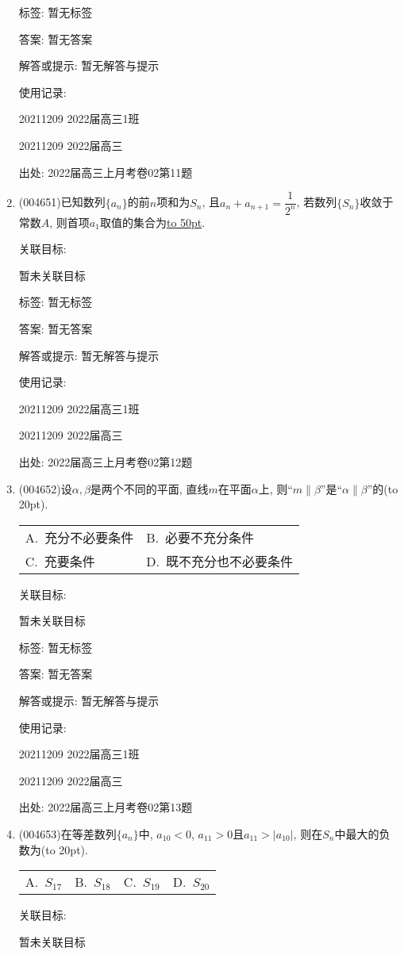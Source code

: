 \documentclass[10pt,a4paper]{article}
\newcommand{\blank}[1]{\underline{\hbox to #1pt{}}}
\newcommand{\bracket}[1]{(\hbox to #1pt{})}
\newcommand{\twoch}[4]{\par\begin{tabular}{p{.46\textwidth}p{.46\textwidth}}
A.~#1& B.~#2\\
C.~#3& D.~#4
\end{tabular}}
\newcommand{\fourch}[4]{\par\begin{tabular}{p{.23\textwidth}p{.23\textwidth}p{.23\textwidth}p{.23\textwidth}}
A.~#1 &B.~#2& C.~#3& D.~#4
\end{tabular}}
\begin{document}
\begin{enumerate}[1.]
标签: 暂无标签

答案: 暂无答案

解答或提示: 暂无解答与提示

使用记录:

20211209	2022届高三1班	

20211209	2022届高三	


出处: 2022届高三上月考卷02第11题
\item { (004651)}已知数列$\{a_n\}$的前$n$项和为$S_n$, 且$a_n+a_{n+1}=\dfrac 1{2^n}$, 若数列$\{S_n\}$收敛于常数$A$, 则首项$a_1$取值的集合为\blank{50}.


关联目标:

暂未关联目标



标签: 暂无标签

答案: 暂无答案

解答或提示: 暂无解答与提示

使用记录:

20211209	2022届高三1班	

20211209	2022届高三	


出处: 2022届高三上月考卷02第12题
\item { (004652)}设$\alpha,\beta$是两个不同的平面, 直线$m$在平面$\alpha$上, 则``$m\parallel\beta$''是``$\alpha\parallel\beta$''的\bracket{20}.
\twoch{充分不必要条件}{必要不充分条件}{充要条件}{既不充分也不必要条件}


关联目标:

暂未关联目标



标签: 暂无标签

答案: 暂无答案

解答或提示: 暂无解答与提示

使用记录:

20211209	2022届高三1班	

20211209	2022届高三	


出处: 2022届高三上月考卷02第13题
\item { (004653)}在等差数列$\{a_n\}$中, $a_{10}<0$, $a_{11}>0$且$a_{11}>|a_{10}|$, 则在$S_n$中最大的负数为\bracket{20}.
\fourch{$S_{17}$}{$S_{18}$}{$S_{19}$}{$S_{20}$}


关联目标:

暂未关联目标




\end{enumerate}
\end{document}
